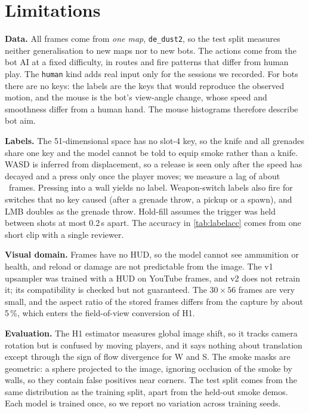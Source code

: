 \section{Limitations}
\label{sec:limits}
\textbf{Data.}
All frames come from \emph{one map}, \texttt{de\_dust2}, so the test split measures neither generalisation to new maps nor to new bots.
The actions come from the bot AI at a fixed difficulty, in routes and fire patterns that differ from human play.
The \texttt{human} kind adds real input only for the sessions we recorded.
For bots there are no keys: the labels are the keys that would reproduce the observed motion, and the mouse is the bot's view-angle change, whose speed and smoothness differ from a human hand.
The mouse histograms therefore describe bot aim.

\textbf{Labels.}
The 51-dimensional space has no slot-4 key, so the knife and all grenades share one key and the model cannot be told to equip smoke rather than a knife.
WASD is inferred from displacement, so a release is seen only after the speed has decayed and a press only once the player moves; we measure a lag of about \TBDwasdlag\ frames.
Pressing into a wall yields no label.
Weapon-switch labels also fire for switches that no key caused (after a grenade throw, a pickup or a spawn), and LMB doubles as the grenade throw.
Hold-fill assumes the trigger was held between shots at most 0.2\,s apart.
The accuracy in \cref{tab:labelacc} comes from one short clip with a single reviewer.

\textbf{Visual domain.}
Frames have no HUD, so the model cannot see ammunition or health, and reload or damage are not predictable from the image.
The v1 upsampler was trained with a HUD on YouTube frames, and v2 does not retrain it; its compatibility is checked but not guaranteed.
The $30{\times}56$ frames are very small, and the aspect ratio of the stored frames differs from the capture by about 5\,\%, which enters the field-of-view conversion of H1.

\textbf{Evaluation.}
The H1 estimator measures global image shift, so it tracks camera rotation but is confused by moving players, and it says nothing about translation except through the sign of flow divergence for W and S.
The smoke masks are geometric: a sphere projected to the image, ignoring occlusion of the smoke by walls, so they contain false positives near corners.
The test split comes from the same distribution as the training split, apart from the held-out smoke demos.
Each model is trained once, so we report no variation across training seeds.
